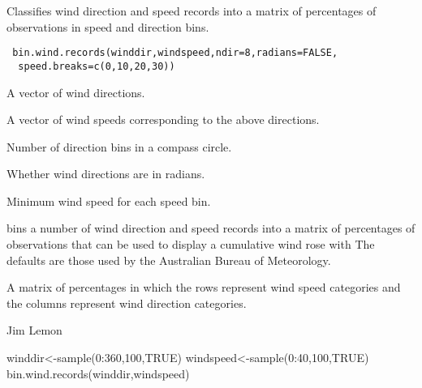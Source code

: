 \begin{Description}\relax
Classifies wind direction and speed records into a matrix of
percentages of observations in speed and direction bins.
\end{Description}
\begin{Usage}
\begin{verbatim}
 bin.wind.records(winddir,windspeed,ndir=8,radians=FALSE,
  speed.breaks=c(0,10,20,30))
\end{verbatim}
\end{Usage}
\begin{Arguments}
\begin{ldescription}
\item[\code{winddir}] A vector of wind directions.
\item[\code{windspeed}] A vector of wind speeds corresponding to the above
directions.
\item[\code{ndir}] Number of direction bins in a compass circle.
\item[\code{radians}] Whether wind directions are in radians.
\item[\code{speed.breaks}] Minimum wind speed for each speed bin.
\end{ldescription}
\end{Arguments}
\begin{Details}\relax
{} bins a number of wind direction and speed
records into a matrix of percentages of observations that can be used to
display a cumulative wind rose with  The defaults are those
used by the Australian Bureau of Meteorology.
\end{Details}
\begin{Value}
A matrix of percentages in which the rows represent wind speed categories and 
the columns represent wind direction categories.
\end{Value}
\begin{Author}\relax
Jim Lemon
\end{Author}
\begin{SeeAlso}\relax
{}
\end{SeeAlso}
\begin{Examples}
\begin{ExampleCode}
 winddir<-sample(0:360,100,TRUE)
 windspeed<-sample(0:40,100,TRUE)
 bin.wind.records(winddir,windspeed)
\end{ExampleCode}
\end{Examples}

